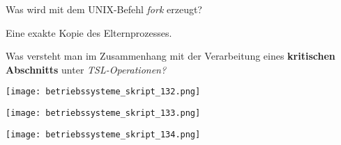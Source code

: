 \documentclass{article}
\begin{document}
\begin{tcolorbox}[colback=white!10!white,colframe=lightgray!75!black,
  savelowerto=\jobname_ex.tex,breakable,enhanced,lines before break=40]

\begin{center}
Was wird mit dem UNIX-Befehl 
\textit{fork
} erzeugt?

\end{center}

\tcblower

\justifying
Eine exakte Kopie des Elternprozesses.

\end{tcolorbox}
\begin{tcolorbox}[colback=white!10!white,colframe=lightgray!75!black,
  savelowerto=\jobname_ex.tex,breakable,enhanced,lines before break=40]

\begin{center}
Was versteht man im Zusammenhang mit der Verarbeitung eines 
\textbf{kritischen Abschnitts
} unter 
\textit{TSL-Operationen?
}
\end{center}

\tcblower

\justifying
\begin{center}
\texttt{[image: betriebssysteme\_skript\_132.png]}
\end{center}
\begin{center}
\texttt{[image: betriebssysteme\_skript\_133.png]}
\end{center}
\begin{center}
\texttt{[image: betriebssysteme\_skript\_134.png]}
\end{center}

\end{tcolorbox}
\end{document}
